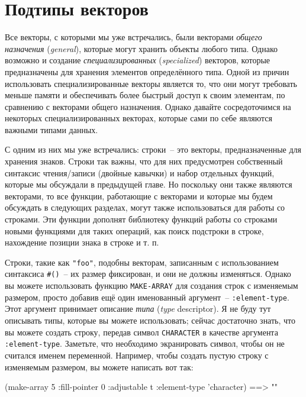 \section{Подтипы векторов}

Все векторы, с которыми мы уже встречались, были векторами \textit{общего назначения}
(\textit{general}), которые могут хранить объекты любого типа.  Однако возможно и
создание \textit{специализированных} (\textit{specialized}) векторов,
которые предназначены для хранения элементов определённого типа.  Одной из
причин использовать специализированные векторы является то, что они могут требовать
меньше памяти и обеспечивать более быстрый доступ к своим элементам, по сравнению с
векторами общего назначения.  Однако давайте сосредоточимся на некоторых
специализированных векторах, которые сами по себе являются важными типами данных.

С одним из них мы уже встречались: строки~-- это векторы, предназначенные для хранения
знаков.  Строки так важны, что для них предусмотрен собственный синтаксис чтения/записи
(двойные кавычки) и набор отдельных функций, которые мы обсуждали в предыдущей главе.  Но
поскольку они также являются векторами, то все функции, работающие с векторами и которые мы
будем обсуждать в следующих разделах, могут также использоваться для работы со строками.
Эти функции дополнят библиотеку функций работы со строками новыми функциями для таких
операций, как поиск подстроки в строке, нахождение позиции знака в строке и т. п.

Строки, такие как \lstinline{"foo"}, подобны векторам, записанным с использованием синтаксиса
\lstinline!#()!~-- их размер фиксирован, и они не должны изменяться.  Однако вы можете
использовать функцию \lstinline{MAKE-ARRAY} для создания строк с изменяемым размером, просто
добавив ещё один именованный аргумент~-- \lstinline{:element-type}.  Этот аргумент принимает
описание \textit{типа} (\textit{type} descriptor).  Я не буду тут описывать типы, которые
вы можете использовать; сейчас достаточно знать, что вы можете создать строку, передав символ
\lstinline{CHARACTER} в качестве аргумента \lstinline{:element-type}.  Заметьте, что необходимо экранировать
символ, чтобы он не считался именем переменной.  Например, чтобы создать пустую строку с
изменяемым размером, вы можете написать вот так:

\begin{myverb}
  (make-array 5 :fill-pointer 0 :adjustable t :element-type 'character) ==> ""
\end{myverb}

